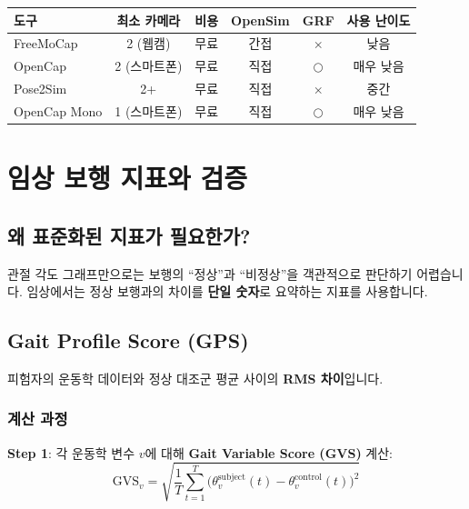 \documentclass[11pt, a4paper]{report}
\begin{document}
\begin{center}
\renewcommand{\arraystretch}{1.3}
\small
\begin{tabular}{p{2.5cm}ccccc}
\toprule
\textbf{도구} & \textbf{최소 카메라} & \textbf{비용} & \textbf{OpenSim} & \textbf{GRF} & \textbf{사용 난이도} \\
\midrule
FreeMoCap & 2 (웹캠) & 무료 & 간접 & $\times$ & 낮음 \\
OpenCap & 2 (스마트폰) & 무료 & 직접 & $\bigcirc$ & 매우 낮음 \\
Pose2Sim & 2+ & 무료 & 직접 & $\times$ & 중간 \\
OpenCap Mono & 1 (스마트폰) & 무료 & 직접 & $\bigcirc$ & 매우 낮음 \\
\bottomrule
\end{tabular}
\end{center}


\chapter{임상 보행 지표와 검증}
\label{ch:clinical}

\section{왜 표준화된 지표가 필요한가?}

관절 각도 그래프만으로는 보행의 ``정상''과 ``비정상''을 객관적으로 판단하기 어렵습니다. 임상에서는 정상 보행과의 차이를 \textbf{단일 숫자}로 요약하는 지표를 사용합니다.


\section{Gait Profile Score (GPS)}

\begin{definition}
피험자의 운동학 데이터와 정상 대조군 평균 사이의 \textbf{RMS 차이}입니다.
\end{definition}

\subsection{계산 과정}

\textbf{Step 1}: 각 운동학 변수 $v$에 대해 \textbf{Gait Variable Score (GVS)} 계산:
\begin{equation}
\text{GVS}_v = \sqrt{\frac{1}{T} \sum_{t=1}^{T} \big( \theta_v^{\text{subject}}(t) - \theta_v^{\text{control}}(t) \big)^2}
\label{eq:gvs}
\end{equation}
\end{document}
